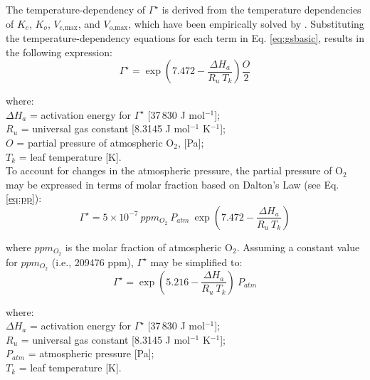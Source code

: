 \noindent The temperature-dependency of $\Gamma^\star$ is derived from the temperature dependencies of $K_c$, $K_o$, $V_\text{c,max}$, and $V_\text{o,max}$, which have been empirically solved by \cite{bernacchi01}. 
Substituting the temperature-dependency equations for each term in Eq. \ref{eq:gsbasic}, results in the following expression:
\begin{equation}
\label{eq:gst}
    \Gamma^\star = \exp \left(7.472 - \frac{\Delta H_a}{R_u\: T_k}\right) \frac{O}{2}
\end{equation}

\noindent where:\\
\indent $\Delta H_a$ = activation energy for $\Gamma^\star$ [37$\,$830 J mol$^{-1}$];\\
\indent $R_u$ = universal gas constant [8.3145 J mol$^{-1}$ K$^{-1}$];\\
\indent $O$ = partial pressure of atmospheric O$_2$, [Pa];\\
\indent $T_k$ = leaf temperature [K].\\

\noindent To account for changes in the atmospheric pressure, the partial pressure of O$_2$ may be expressed in terms of molar fraction based on Dalton's Law (see Eq. \ref{eq:pp}):
\begin{equation}
\label{eq:gstpa}
    \Gamma^\star = 5\times 10^{-7}\: ppm_{O_2}\: P_{atm}\: \exp \left(7.472 - \frac{\Delta H_a}{R_u\: T_k}\right)
\end{equation}

\noindent where $ppm_{O_2}$ is the molar fraction of atmospheric O$_2$. Assuming a constant value for $ppm_{O_2}$ (i.e., 209476 ppm), $\Gamma^\star$ may be simplified to:
\begin{equation}
\label{eq:gstpb}
    \Gamma^\star = \exp \left(5.216 - \frac{\Delta H_a}{R_u\: T_k}\right)\: P_{atm}
\end{equation}

\noindent where:\\
\indent $\Delta H_a$ = activation energy for $\Gamma^\star$ [37$\,$830 J mol$^{-1}$];\\
\indent $R_u$ = universal gas constant [8.3145 J mol$^{-1}$ K$^{-1}$];\\
\indent $P_{atm}$ = atmospheric pressure [Pa];\\
\indent $T_k$ = leaf temperature [K].\\

